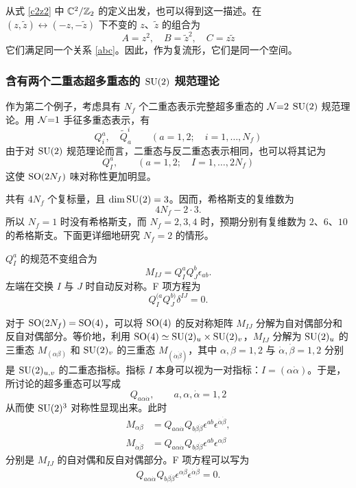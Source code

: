 从式 \eqref{c2z2} 中 $\mathbb{C}^2/\mathbb{Z}_2$ 的定义出发，也可以得到这一描述。在 $(z,\tilde z)\leftrightarrow(-z,-\tilde z)$ 下不变的 $z$、$\tilde z$ 的组合为
\begin{equation}
A=z^2,\quad B=\tilde z^2,\quad C=z\tilde z
\end{equation}
它们满足同一个关系 \eqref{abc}。因此，作为复流形，它们是同一个空间。

\subsubsection{含有两个二重态超多重态的 $\mathop{\mathrm{SU}}(2)$ 规范理论}
作为第二个例子，考虑具有 $N_f$ 个二重态表示完整超多重态的 $\mathcal{N}{=}2$ $\mathop{\mathrm{SU}}(2)$ 规范理论。用 $\mathcal{N}{=}1$ 手征多重态表示，有
\begin{equation}
Q_i^a,\quad\tilde Q^i_a\qquad(a=1,2;\quad i=1,\ldots,N_f)
\end{equation}
由于对 $\mathop{\mathrm{SU}}(2)$ 规范理论而言，二重态与反二重态表示相同，也可以将其记为
\begin{equation}
Q_I^a,\qquad(a=1,2;\quad I=1,\ldots,2N_f)
\end{equation}
这使 $\mathop{\mathrm{SO}}(2N_f)$ 味对称性更加明显。

共有 $4N_f$ 个复标量，且 $\dim\mathop{\mathrm{SU}}(2)=3$。因而，希格斯支的复维数为
\begin{equation}
4N_f-2\cdot3.\label{dimform}
\end{equation}
所以 $N_f=1$ 时没有希格斯支，而 $N_f=2,3,4$ 时，预期分别有复维数为 $2$、$6$、$10$ 的希格斯支。下面更详细地研究 $N_f=2$ 的情形。

$Q_I^a$ 的规范不变组合为
\begin{equation}
M_{IJ}=Q_I^aQ_J^b\epsilon_{ab}.\label{su2mesons}
\end{equation}
左端在交换 $I$ 与 $J$ 时自动反对称。F 项方程为
\begin{equation}
Q_I^{(a}Q_J^{b)}\delta^{IJ}=0.\label{su2Dterm}
\end{equation}

对于 $\mathop{\mathrm{SO}}(2N_f)=\mathop{\mathrm{SO}}(4)$，可以将 $\mathop{\mathrm{SO}}(4)$ 的反对称矩阵 $M_{IJ}$ 分解为自对偶部分和反自对偶部分。等价地，利用 $\mathop{\mathrm{SO}}(4)\simeq\mathop{\mathrm{SU}}(2)_u\times\mathop{\mathrm{SU}}(2)_v$，$M_{IJ}$ 分解为 $\mathop{\mathrm{SU}}(2)_u$ 的三重态 $M_{(\alpha\beta)}$ 和 $\mathop{\mathrm{SU}}(2)_v$ 的三重态 $M_{(\dot\alpha\dot\beta)}$，其中 $\alpha,\beta=1,2$ 与 $\dot\alpha,\dot\beta=1,2$ 分别是 $\mathop{\mathrm{SU}}(2)_{u,v}$ 的二重态指标。指标 $I$ 本身可以视为一对指标：$I=(\alpha\dot\alpha)$。于是，所讨论的超多重态可以写成
\begin{equation}
Q_{a\alpha\dot\alpha},\qquad a,\alpha,\dot\alpha=1,2
\end{equation}
从而使 $\mathop{\mathrm{SU}}(2)^3$ 对称性显现出来。此时
\begin{align}
M_{\alpha\beta}&=Q_{a\alpha\dot\alpha}Q_{b\beta\dot\beta}\epsilon^{ab}\epsilon^{\dot\alpha\dot\beta},\\
M_{\dot\alpha\dot\beta}&=Q_{a\alpha\dot\alpha}Q_{b\beta\dot\beta}\epsilon^{ab}\epsilon^{\alpha\beta}
\end{align}
分别是 $M_{IJ}$ 的自对偶和反自对偶部分。F 项方程可以写为
\begin{equation}
Q_{a\alpha\dot\alpha}Q_{b\beta\dot\beta}\epsilon^{\alpha\beta}\epsilon^{\dot\alpha\dot\beta}=0.
\end{equation}

